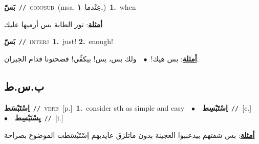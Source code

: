 \documentclass[10pt,a4paper,twoside]{article} %
\begin{document}
\begin{multicols}{2}
{\setlength\topsep{0pt}\textbf{\foreignlanguage{arabic}{بَسّ}}\ {\color{gray}\texttt{//}\color{black}}\ \textsc{conj\textunderscore sub}\ \color{gray}(msa. \foreignlanguage{arabic}{عِنْدما}~\foreignlanguage{arabic}{\textbf{١.}})\color{black}\ \textbf{1.}~when\  \begin{flushright}\color{gray}\foreignlanguage{arabic}{\textbf{\underline{\foreignlanguage{arabic}{أمثلة}}}: توز الطابة بس أرميها عليك}\end{flushright}\color{black}} \vspace{2mm}

{\setlength\topsep{0pt}\textbf{\foreignlanguage{arabic}{بَسّ}}\ {\color{gray}\texttt{//}\color{black}}\ \textsc{interj}\ \textbf{1.}~just!  \textbf{2.}~enough!\  \begin{flushright}\color{gray}\foreignlanguage{arabic}{\textbf{\underline{\foreignlanguage{arabic}{أمثلة}}}: بس هيك!\ $\bullet$\ \  ولك بس، بس! بيكفِّي! فضحتونا قدام الجيران.}\end{flushright}\color{black}} \vspace{2mm}

\vspace{-3mm}
\subsection*{\color{blue}\foreignlanguage{arabic}{ب.س.ط}\color{blue}{}} 

{\setlength\topsep{0pt}\textbf{\foreignlanguage{arabic}{اِسْتَبْسَط}}\ {\color{gray}\texttt{//}\color{black}}\ \textsc{verb}\ [p.]\ \textbf{1.}~consider sth as simple and easy\ \ $\bullet$\ \ \setlength\topsep{0pt}\textbf{\foreignlanguage{arabic}{اِسْتَبْسِط}}\ {\color{gray}\texttt{//}\color{black}}\ [c.]\ \ $\bullet$\ \ \setlength\topsep{0pt}\textbf{\foreignlanguage{arabic}{يِسْتَبْسِط}}\ {\color{gray}\texttt{//}\color{black}}\ [i.]\  \begin{flushright}\color{gray}\foreignlanguage{arabic}{\textbf{\underline{\foreignlanguage{arabic}{أمثلة}}}: بس شفتهم بيدعببوا العجينة بدون ماتلزق عايديهم اِسْتَبْسَطت الموضوع بصراحة}\end{flushright}\color{black}} \vspace{2mm}


\end{multicols}
\end{document}
